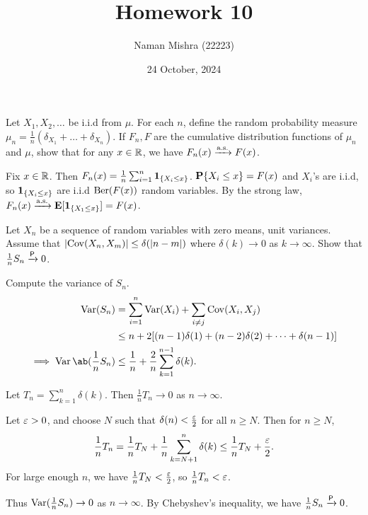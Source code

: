 \documentclass[12pt]{article}
\title{Homework 10}
\author{Naman Mishra (22223)}
\date{24 October, 2024}
\begin{document}
\maketitle

\begin{problem*}
    Let $X_1, X_2, \dots$ be i.i.d from $\mu$.
    For each $n$, define the random probability measure
    $\mu_n = \frac1n (\delta_{X_1} + \dots + \delta_{X_n})$.
    If $F_n, F$ are the cumulative distribution functions of $\mu_n$ and
    $\mu$, show that for any $x \in \mathbb{R}$, we have $F_n(x) \xrightarrow{\text{a.s.}} F(x)$.
\end{problem*}
\begin{solution}
    Fix $x \in \mathbb{R}$.
    Then $F_n(x) = \frac1n \sum_{i=1}^n \bm{1}_{\{X_i \le x\}}$.
    $\operatorname{\mathbf P}\{X_i \le x\} = F(x)$ and $X_i$'s are i.i.d, so
    $\bm{1}_{\{X_i \le x\}}$ are i.i.d $\operatorname{Ber}(F(x))$ random variables.
    By the strong law,
    $F_n(x) \xrightarrow{\text{a.s.}} \operatorname{\mathbf E}[\bm{1}_{\{X_1 \le x\}}] = F(x)$.
\end{solution}

\begin{problem*}
    Let $X_n$ be a sequence of random variables with zero means, unit
    variances.
    Assume that $\lvert\operatorname{Cov}(X_n, X_m)\rvert \le \delta(\lvert n-m\rvert)$ where
    $\delta(k) \to 0$ as $k \to \infty$.
    Show that $\frac1n S_n \xrightarrow{\mathsf{P}} 0$.
\end{problem*}
\begin{solution}
    Compute the variance of $S_n$.
    \begin{align*}
        \Var(S_n)
            &= \sum_{i=1}^n \Var(X_i) + \sum_{i \ne j} \Cov(X_i, X_j) \\
            &\le n + 2 [(n-1) \delta(1) + (n-2) \delta(2) +
                                \dots + \delta (n-1)] \\
        \implies \Var\ab(\frac1n S_n)
            &\le \frac1n + \frac2n \sum_{k=1}^{n-1} \delta(k).
    \end{align*}
    \begin{claim}
        Let $T_n = \sum_{k=1}^n \delta(k)$.
        Then $\frac1n T_n \to 0$ as $n \to \infty$.
    \end{claim}
    \begin{subproof}
        Let $\varepsilon > 0$, and choose $N$ such that
        $\delta(n) < \frac{\varepsilon}{2}$ for all $n \ge N$.
        Then for $n \ge N$, \[
            \frac1n T_n = \frac1n T_N + \frac1n \sum_{k=N+1}^n \delta(k)
            \le \frac1n T_N + \frac{\varepsilon}{2}.
        \]
        For large enough $n$, we have $\frac1n T_N < \frac{\varepsilon}{2}$,
        so $\frac1n T_n < \varepsilon$.
    \end{subproof}
    Thus $\operatorname{Var}(\frac1n S_n) \to 0$ as $n \to \infty$.
    By Chebyshev's inequality, we have $\frac1n S_n \xrightarrow{\mathsf{P}} 0$.
\end{solution}
\end{document}
